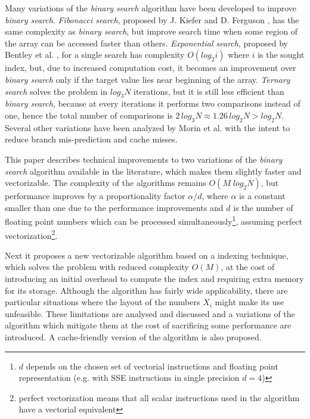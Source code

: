 \documentclass[preprint,1p,times]{elsarticle}
\begin{document}
Many variations of the \textit{binary search} algorithm have been developed to improve \textit{binary search}. \textit{Fibonacci search}, proposed by J. Kiefer \cite{Kiefer1953} and D. Ferguson \cite{Ferguson1960}, has the same complexity as \textit{binary search}, but improve search time when some region of the array can be accessed faster than others. \textit{Exponential search}, proposed by Bentley et al. \cite{Bentley1976}, for a single search has complexity $O\left(log_2i\right)$ where $i$ is the sought index, but, due to increased computation cost, it becomes an improvement over \textit{binary search} only if the target value lies near beginning of the array. \textit{Ternary search} solves the problem in $log_3N$ iterations, but it is still less efficient than \textit{binary search}, because at every iterations it performs two comparisons instead of one, hence the total number of comparisons is $2\,log_3N\approx 1.26\,log_2N>log_2N$.  Several other variations have been analyzed by Morin et al. \cite{Morin2015} with the intent to reduce branch mis-prediction and cache misses.

This paper describes technical improvements to two variations of the \textit{binary search} algorithm available in the literature, which makes them slightly faster and vectorizable. The complexity of the algorithms remains $O\left(M\;log_2N\right)$, but performance improves by a proportionality factor $\alpha/d$, where $\alpha$ is a constant smaller than one due to the performance improvements and $d$ is the number of floating point numbers which can be processed simultaneously\footnote{$d$ depends on the chosen set of vectorial instructions and floating point representation (e.g. with SSE instructions in single precision $d=4$)}, assuming perfect vectorization\footnote{perfect vectorization means that all scalar instructions used in the algorithm have a vectorial equivalent}. 

Next it proposes a new vectorizable algorithm based on a indexing technique, which solves the problem with reduced complexity $O(M)$, at the cost of introducing an initial overhead to compute the index and requiring extra memory for its storage. Although the algorithm has fairly wide applicability, there are particular situations where the layout of the numbers $X_i$ might make its use unfeasible. These limitations are analysed and discussed and a variations of the algorithm which mitigate them at the cost of sacrificing some performance are introduced. A cache-friendly version of the algorithm is also proposed.
\end{document}
